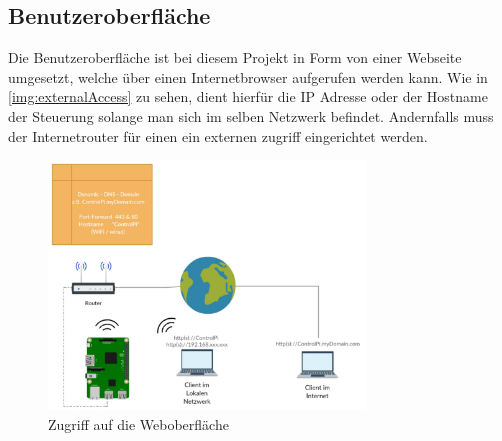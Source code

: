 \subsection{Benutzeroberfläche}
Die Benutzeroberfläche ist bei diesem Projekt in Form von einer Webseite umgesetzt, welche über einen Internetbrowser aufgerufen werden kann.  Wie in \autoref{img:externalAccess} zu sehen, dient hierfür die IP Adresse oder der Hostname der Steuerung solange man sich im selben Netzwerk befindet. Andernfalls muss der Internetrouter für einen ein externen zugriff eingerichtet werden. 
 \begin{figure}[H]
	\begin{center}
		\includegraphics[width=0.75\textwidth ,clip]{./images/IFTTT.pdf}
		\caption{Zugriff auf die Weboberfläche}
		\label{img:externalAccess}
	\end{center} 
\end{figure}

